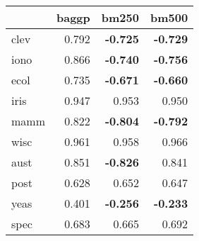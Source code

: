 \begin{tabular}{lrrr}
\toprule
{} &  baggp &  bm250 &  bm500 \\
\midrule
clev & 0.792 &    \textbf{-0.725} &    \textbf{-0.729} \\
iono & 0.866 &    \textbf{-0.740} &    \textbf{-0.756} \\
ecol & 0.735 &    \textbf{-0.671} &    \textbf{-0.660} \\
iris & 0.947 & 0.953 & 0.950 \\
mamm & 0.822 &    \textbf{-0.804} &    \textbf{-0.792} \\
wisc & 0.961 & 0.958 & 0.966 \\
aust & 0.851 &    \textbf{-0.826} & 0.841 \\
post & 0.628 & 0.652 & 0.647 \\
yeas & 0.401 &    \textbf{-0.256} &    \textbf{-0.233} \\
spec & 0.683 & 0.665 & 0.692 \\
\bottomrule
\end{tabular}
